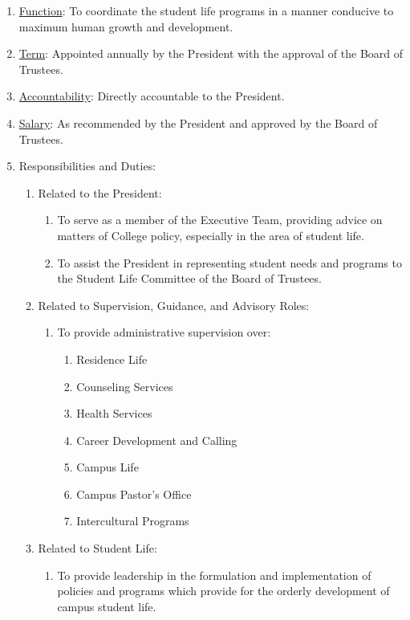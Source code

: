 \documentclass[letterpaper, 11pt]{article}
\begin{document}
					\begin{enumerate}
						\item{\underline{Function}: To coordinate the student life programs in a manner conducive to maximum human growth and development.}
						\item{\underline{Term}: Appointed annually by the President with the approval of the Board of Trustees.}
						\item{\underline{Accountability}: Directly accountable to the President.}
						\item{\underline{Salary}: As recommended by the President and approved by the Board of Trustees.}
						\item{Responsibilities and Duties:
							\begin{enumerate}
								\item{Related to the President:
									\begin{enumerate}
										\item{To serve as a member of the Executive Team, providing advice on matters of College policy, especially in the area of student life.}
										\item{To assist the President in representing student needs and programs to the Student Life Committee of the Board of Trustees.}
									\end{enumerate}
								}
								\item{Related to Supervision, Guidance, and Advisory Roles:
									\begin{enumerate}
										\item{To provide administrative supervision over:
											\begin{enumerate}
												\item{Residence Life}
												\item{Counseling Services}
												\item{Health Services}
												\item{Career Development and Calling}
												\item{Campus Life}
												\item{Campus Pastor's Office}
												\item{Intercultural Programs}
											\end{enumerate}
										}
									\end{enumerate}
								}
								\item{Related to Student Life:
									\begin{enumerate}
										\item{To provide leadership in the formulation and implementation of policies and programs which provide for the orderly development of campus student life.}

\end{enumerate}}
\end{enumerate}}
\end{enumerate}
\end{document}
